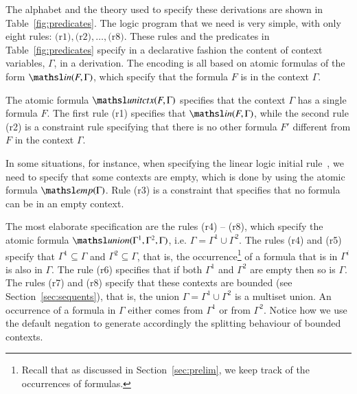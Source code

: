 \documentclass{new_tlp}
\newcommand{\elin}[2]{\ensuremath{{\tsl{unitctx}(\ensuremath{#1}, \ensuremath{#2})}}}
\newcommand{\emp}[1]{\ensuremath{{\tsl{emp}(\ensuremath{#1})}}}
\newcommand{\union}[3]{\ensuremath{{\tsl{union}(\ensuremath{#1},\ensuremath{#2},\ensuremath{ #3})}}}
\newcommand{\In}[2]{\ensuremath{\tsl{in}(\ensuremath{#1},\ensuremath{#2})}}
\begin{document}
The alphabet and the theory used to specify these derivations are shown in Table~\ref{fig:predicates}. 
The logic program that we need is very simple, 
with only eight rules: $\textrm{(r1)}, \textrm{(r2)},\ldots, \textrm{(r8)}$. These
rules and the predicates in Table~\ref{fig:predicates} specify in a declarative 
fashion the content of context variables, $\Gamma$, in a derivation.
The encoding is all based on atomic formulas of the form $\In{F}{\Gamma}$, which 
specify that the formula $F$ is in the context $\Gamma$. 

The atomic formula $\elin{F}{\Gamma}$ specifies that the context $\Gamma$ has a
single formula $F$. 
The first rule (r1) specifies that $\In{F}{\Gamma}$, while the second rule (r2) is a constraint
rule specifying that there is no other formula $F'$ different from $F$ in the context $\Gamma$.

In some situations, for instance, when specifying the linear logic initial rule~\cite{girard87tcs}, 
we need to specify that some contexts are empty, which is done by using the atomic formula $\emp{\Gamma}$.  
Rule (r3) is a constraint that specifies that no formula can be in an empty context.

The most elaborate specification are the rules (r4) -- (r8), which specify the atomic formula 
$\union{\Gamma^1} {\Gamma^2} {\Gamma}$, i.e. $\Gamma = \Gamma^1 \cup \Gamma^2$.
The rules (r4) and (r5) specify that $\Gamma^1 \subseteq \Gamma$ and $\Gamma^2 \subseteq \Gamma$, 
that is, the occurrence\footnote{Recall that as discussed in Section~\ref{sec:prelim}, 
we keep track of the occurrences of formulas.} of a formula that is in $\Gamma^i$ is also in $\Gamma$. The rule (r6) specifies that 
if both $\Gamma^1$ and $\Gamma^2$ are empty then so is $\Gamma$. 
The rules (r7) and (r8) 
specify that these contexts are bounded (see Section~\ref{sec:sequents}), that is, the union 
$\Gamma = \Gamma^1 \cup \Gamma^2$ is a multiset union. An occurrence of a formula in $\Gamma$ either comes
from $\Gamma^1$ or from $\Gamma^2$. Notice how we use the default negation to generate accordingly
the splitting behaviour of bounded contexts. 
\end{document}
